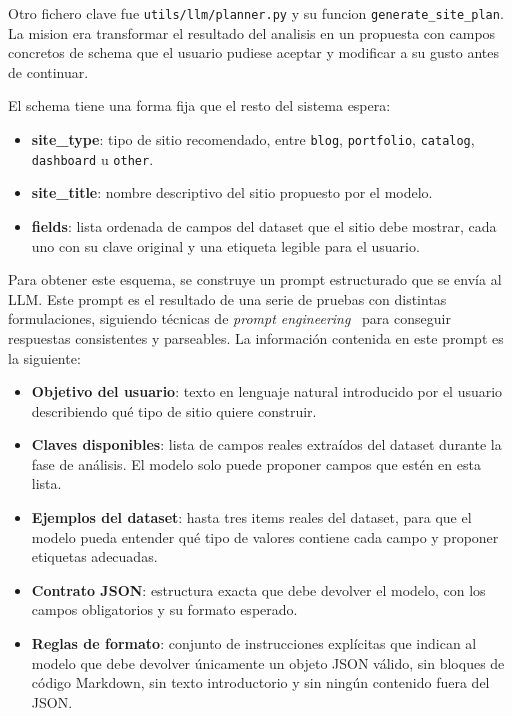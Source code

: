 Otro fichero clave fue \texttt{utils/llm/planner.py} y su funcion \texttt{generate\_site\_plan}. La mision era transformar el resultado del analisis en un propuesta con campos
concretos de schema que el usuario pudiese aceptar y modificar a su gusto antes de continuar.

El schema tiene una forma fija que el resto del sistema espera:
\begin{itemize}
    \item \textbf{site\_type}: tipo de sitio recomendado, entre \texttt{blog}, \texttt{portfolio}, \texttt{catalog}, \texttt{dashboard} u \texttt{other}.
    \item \textbf{site\_title}: nombre descriptivo del sitio propuesto por el modelo.
    \item \textbf{fields}: lista ordenada de campos del dataset que el sitio debe mostrar, cada uno con su clave original y una etiqueta legible para el usuario.
\end{itemize}

Para obtener este esquema, se construye un prompt estructurado que se envía al LLM. Este prompt es el resultado de una serie de pruebas con distintas formulaciones,  
siguiendo técnicas de \emph{prompt engineering}~\cite{openai_prompt_engineering} para conseguir respuestas consistentes y parseables. La información contenida en este 
prompt es la siguiente:

\begin{itemize}
    \item \textbf{Objetivo del usuario}: texto en lenguaje natural introducido por 
    el usuario describiendo qué tipo de sitio quiere construir.
    
    \item \textbf{Claves disponibles}: lista de campos reales extraídos del dataset 
    durante la fase de análisis. El modelo solo puede proponer campos que estén 
    en esta lista.
    
    \item \textbf{Ejemplos del dataset}: hasta tres items reales del dataset, para 
    que el modelo pueda entender qué tipo de valores contiene cada campo y proponer 
    etiquetas adecuadas.
    
    \item \textbf{Contrato JSON}: estructura exacta que debe devolver el modelo, 
    con los campos obligatorios y su formato esperado.
    
    \item \textbf{Reglas de formato}: conjunto de instrucciones explícitas que 
    indican al modelo que debe devolver únicamente un objeto JSON válido, sin 
    bloques de código Markdown, sin texto introductorio y sin ningún contenido 
    fuera del JSON.
\end{itemize}

